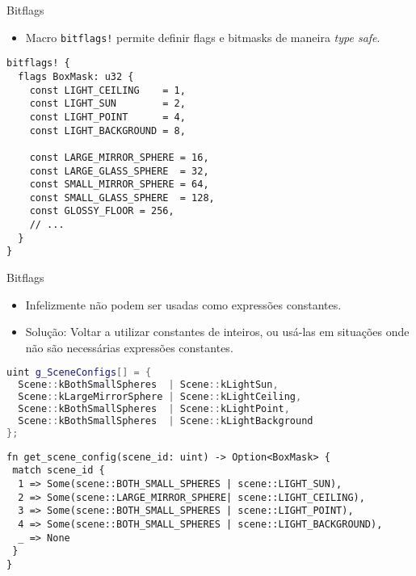 \documentclass{beamer}
\begin{document}
\begin{frame}[fragile]{Bitflags}
	\begin{itemize}
		\item Macro \texttt{bitflags!} permite definir flags e bitmasks de maneira \emph{type safe}.
	\end{itemize}
	\begin{lstlisting}
bitflags! {
  flags BoxMask: u32 {
    const LIGHT_CEILING    = 1,
    const LIGHT_SUN        = 2,
    const LIGHT_POINT      = 4,
    const LIGHT_BACKGROUND = 8,

    const LARGE_MIRROR_SPHERE = 16,
    const LARGE_GLASS_SPHERE  = 32,
    const SMALL_MIRROR_SPHERE = 64,
    const SMALL_GLASS_SPHERE  = 128,
    const GLOSSY_FLOOR = 256,
    // ...
  }
}
	\end{lstlisting}
\end{frame}
\begin{frame}[fragile]{Bitflags}
	\begin{itemize}
		\item Infelizmente não podem ser usadas como expressões constantes.
		\item Solução: Voltar a utilizar constantes de inteiros, ou usá-las em situações onde não são necessárias expressões constantes.
	\end{itemize}
	\begin{overprint}
	\begin{lstlisting}[language=C++]
uint g_SceneConfigs[] = {
  Scene::kBothSmallSpheres  | Scene::kLightSun,
  Scene::kLargeMirrorSphere | Scene::kLightCeiling,
  Scene::kBothSmallSpheres  | Scene::kLightPoint,
  Scene::kBothSmallSpheres  | Scene::kLightBackground
};
	\end{lstlisting}
	\begin{lstlisting}
fn get_scene_config(scene_id: uint) -> Option<BoxMask> {
 match scene_id {
  1 => Some(scene::BOTH_SMALL_SPHERES | scene::LIGHT_SUN),
  2 => Some(scene::LARGE_MIRROR_SPHERE| scene::LIGHT_CEILING),
  3 => Some(scene::BOTH_SMALL_SPHERES | scene::LIGHT_POINT),
  4 => Some(scene::BOTH_SMALL_SPHERES | scene::LIGHT_BACKGROUND),
  _ => None
 }
}
	\end{lstlisting}
	\end{overprint}
\end{frame}
\end{document}
